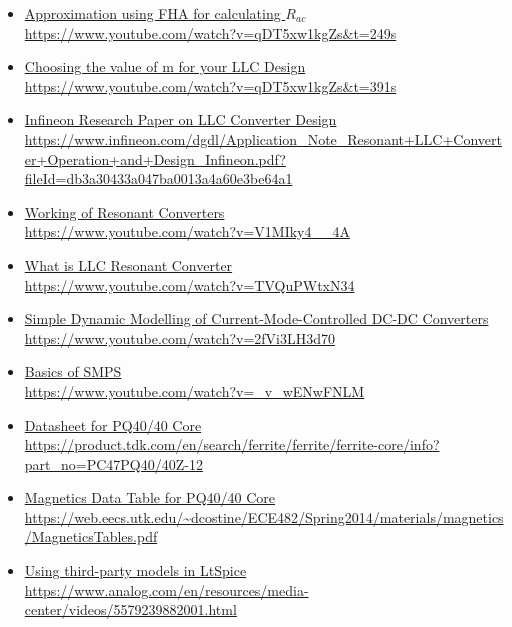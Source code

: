 \begin{itemize}
    \item \href{https://www.youtube.com/watch?v=qDT5xw1kgZs&t=249s}{Approximation using FHA for calculating $R_{ac}$}\\
    \url{https://www.youtube.com/watch?v=qDT5xw1kgZs&t=249s}
    \item \href{https://www.youtube.com/watch?v=qDT5xw1kgZs&t=391s}{Choosing the value of m for your LLC Design}\\
    \url{https://www.youtube.com/watch?v=qDT5xw1kgZs&t=391s}
    \item \href{https://www.infineon.com/dgdl/Application_Note_Resonant+LLC+Converter+Operation+and+Design_Infineon.pdf?fileId=db3a30433a047ba0013a4a60e3be64a1}{Infineon Research Paper on LLC Converter Design}\\
    \url{https://www.infineon.com/dgdl/Application_Note_Resonant+LLC+Converter+Operation+and+Design_Infineon.pdf?fileId=db3a30433a047ba0013a4a60e3be64a1}
    \item \href{https://www.youtube.com/watch?v=V1MIky4__4A}{Working of Resonant Converters}\\
    \url{https://www.youtube.com/watch?v=V1MIky4__4A}
    \item \href{https://www.youtube.com/watch?v=TVQuPWtxN34}{What is LLC Resonant Converter}\\
    \url{https://www.youtube.com/watch?v=TVQuPWtxN34}
    \item \href{https://www.youtube.com/watch?v=2fVi3LH3d70}{Simple Dynamic Modelling of Current-Mode-Controlled DC-DC Converters}\\
    \url{https://www.youtube.com/watch?v=2fVi3LH3d70}
    \item \href{https://www.youtube.com/watch?v=_v_wENwFNLM}{Basics of SMPS}\\
    \url{https://www.youtube.com/watch?v=_v_wENwFNLM}
    \item \href{https://product.tdk.com/en/search/ferrite/ferrite/ferrite-core/info?part_no=PC47PQ40/40Z-12}{Datasheet for PQ40/40 Core}\\
    \url{https://product.tdk.com/en/search/ferrite/ferrite/ferrite-core/info?part_no=PC47PQ40/40Z-12}
    \item \href{https://web.eecs.utk.edu/~dcostine/ECE482/Spring2014/materials/magnetics/MagneticsTables.pdf}{Magnetics Data Table for PQ40/40 Core}\\
    \url{https://web.eecs.utk.edu/~dcostine/ECE482/Spring2014/materials/magnetics/MagneticsTables.pdf}
    \item \href{https://www.analog.com/en/resources/media-center/videos/5579239882001.html}{Using third-party models in LtSpice}\\
    \url{https://www.analog.com/en/resources/media-center/videos/5579239882001.html}
\end{itemize}